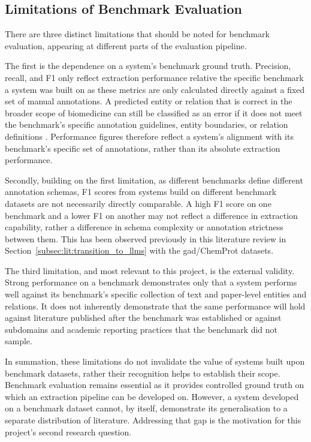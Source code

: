 \subsection{Limitations of Benchmark Evaluation}
\label{subsec:lit:limitations_of_benchmark_eval}
There are three distinct limitations that should be noted for benchmark evaluation, appearing at different parts of the evaluation pipeline.

The first is the dependence on a system's benchmark ground truth. Precision, recall, and F1 only reflect extraction performance relative the specific benchmark a system was built on as these metrics are only calculated directly against a fixed set of manual annotations. A predicted entity or relation that is correct in the broader scope of biomedicine can still be classified as an error if it does not meet the benchmark's specific annotation guidelines, entity boundaries, or relation definitions \pref. Performance figures therefore reflect a system's alignment with its benchmark's specific set of annotations, rather than its absolute extraction performance.

Secondly, building on the first limitation, as different benchmarks define different annotation schemas, F1 scores from systems build on different benchmark datasets are not necessarily directly comparable. A high F1 score on one benchmark and a lower F1 on another may not reflect a difference in extraction capability, rather a difference in schema complexity or annotation strictness between them. This has been observed previously in this literature review in Section~\ref{subsec:lit:transition_to_llms} with the \gls{gad}/ChemProt datasets.

The third limitation, and most relevant to this project, is the external validity. Strong performance on a benchmark demonstrates only that a system performs well against its benchmark's specific collection of text and paper-level entities and relations. It does not inherently demonstrate that the same performance will hold against literature published after the benchmark was established or against subdomains and academic reporting practices that the benchmark did not sample.

In summation, these limitations do not invalidate the value of systems built upon benchmark datasets, rather their recognition helps to establish their scope. Benchmark evaluation remains essential as it provides controlled ground truth on which an extraction pipeline can be developed on. However, a system developed on a benchmark dataset cannot, by itself, demonstrate its generalisation to a separate distribution of literature. Addressing that gap is the motivation for this project's second research question.

